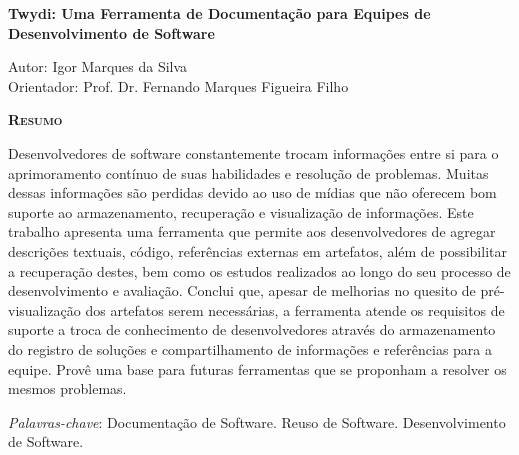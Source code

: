 \begin{center}
	{\Large{\textbf{Twydi: Uma Ferramenta de Documentação para Equipes de Desenvolvimento de Software}}}
\end{center}

\vspace{1cm}

\begin{flushright}
	Autor: Igor Marques da Silva\\
	Orientador: Prof. Dr. Fernando Marques Figueira Filho
\end{flushright}

\vspace{1cm}

\begin{center}
	\Large{\textsc{\textbf{Resumo}}}
\end{center}

\noindent Desenvolvedores de software constantemente trocam informações entre si para o aprimoramento contínuo de suas habilidades e resolução de problemas. Muitas dessas informações são perdidas devido ao uso de mídias que não oferecem bom suporte ao armazenamento, recuperação e visualização de informações.
Este trabalho apresenta uma ferramenta que permite aos desenvolvedores de agregar descrições textuais, código, referências externas em artefatos, além de possibilitar a recuperação destes, bem como os estudos realizados ao longo do seu processo de desenvolvimento e avaliação. Conclui que, apesar de melhorias no quesito de pré-visualização dos artefatos serem necessárias, a ferramenta atende os requisitos de suporte a troca de conhecimento de desenvolvedores através do armazenamento do registro de soluções e compartilhamento de informações e  referências para a equipe. Provê uma base para futuras ferramentas que se proponham a resolver os mesmos problemas.

\noindent\textit{Palavras-chave}: Documentação de Software. Reuso de Software. Desenvolvimento de Software.
